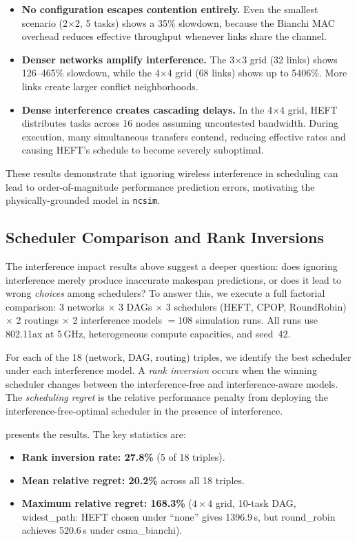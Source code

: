 \documentclass[conference]{IEEEtran}
\newcommand{\ncsim}{\texttt{ncsim}}
\begin{document}
\begin{itemize}[itemsep=1pt,leftmargin=*]
\item \textbf{No configuration escapes contention entirely.}  Even the
  smallest scenario (2$\times$2, 5 tasks) shows a 35\% slowdown, because
  the Bianchi MAC overhead reduces effective throughput whenever links
  share the channel.
\item \textbf{Denser networks amplify interference.}  The 3$\times$3 grid
  (32 links) shows 126--465\% slowdown, while the 4$\times$4 grid (68 links)
  shows up to 5406\%.  More links create larger conflict neighborhoods.
\item \textbf{Dense interference creates cascading delays.}  In the
  4$\times$4 grid, HEFT distributes tasks across 16 nodes assuming
  uncontested bandwidth.  During execution, many simultaneous transfers
  contend, reducing effective rates and causing HEFT's schedule to
  become severely suboptimal.
\end{itemize}

\noindent These results demonstrate that ignoring wireless interference in
scheduling can lead to order-of-magnitude performance prediction errors,
motivating the physically-grounded model in \ncsim{}.


\subsection{Scheduler Comparison and Rank Inversions}
\label{sec:scheduler_eval}

The interference impact results above suggest a deeper question: does
ignoring interference merely produce inaccurate makespan predictions, or
does it lead to wrong \emph{choices} among schedulers?  To answer this, we
execute a full factorial comparison: 3 networks $\times$ 3 DAGs $\times$
3 schedulers (HEFT, CPOP, RoundRobin) $\times$ 2 routings $\times$ 2
interference models $= 108$ simulation runs.  All runs use 802.11ax at
5\,GHz, heterogeneous compute capacities, and seed~42.

For each of the 18 (network, DAG, routing) triples, we identify the best
scheduler under each interference model.  A \emph{rank inversion} occurs
when the winning scheduler changes between the interference-free and
interference-aware models.  The \emph{scheduling regret} is the relative
performance penalty from deploying the interference-free-optimal scheduler
in the presence of interference.

 presents the results.  The key statistics are:
\begin{itemize}[itemsep=1pt,leftmargin=*]
\item \textbf{Rank inversion rate: 27.8\%} (5 of 18 triples).
\item \textbf{Mean relative regret: 20.2\%} across all 18 triples.
\item \textbf{Maximum relative regret: 168.3\%} ($4\times4$ grid,
  10-task DAG, widest\_path: HEFT chosen under ``none'' gives
  1396.9\,s, but round\_robin achieves 520.6\,s under csma\_bianchi).
\end{itemize}
\end{document}
